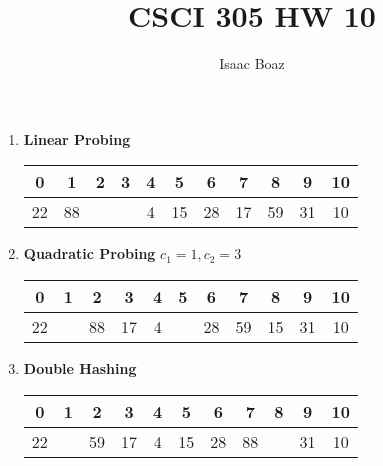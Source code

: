 \documentclass{article}
\title{CSCI 305 HW 10}
\author{Isaac Boaz}
\begin{document}
\maketitle

\begin{enumerate}
      \item \textbf{Linear Probing} \\
            \begin{tabular}{|c|c|c|c|c|c|c|c|c|c|c|}
                  \hline
                  0  & 1  & 2 & 3 & 4 & 5  & 6  & 7  & 8  & 9  & 10 \\
                  \hline
                  22 & 88 &   &   & 4 & 15 & 28 & 17 & 59 & 31 & 10 \\
                  \hline
            \end{tabular}
      \item \textbf{Quadratic Probing} \(c_1 = 1, c_2 = 3\) \\
            \begin{tabular}{|c|c|c|c|c|c|c|c|c|c|c|}
                  \hline
                  0  & 1 & 2  & 3  & 4 & 5 & 6  & 7  & 8  & 9  & 10 \\
                  \hline
                  22 &   & 88 & 17 & 4 &   & 28 & 59 & 15 & 31 & 10 \\
                  \hline
            \end{tabular}
      \item \textbf{Double Hashing} \\
            \begin{tabular}{|c|c|c|c|c|c|c|c|c|c|c|}
                  \hline
                  0  & 1 & 2  & 3  & 4 & 5  & 6  & 7  & 8 & 9  & 10 \\
                  \hline
                  22 &   & 59 & 17 & 4 & 15 & 28 & 88 &   & 31 & 10 \\
                  \hline
            \end{tabular}
\end{enumerate}
\end{document}
